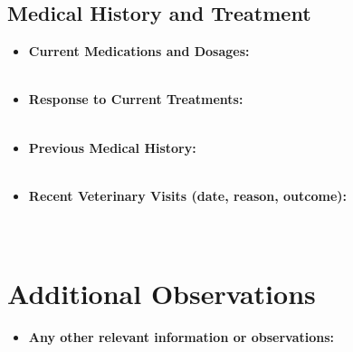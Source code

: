 \documentclass{article}
\begin{document}
\subsection*{Medical History and Treatment}
\begin{itemize}
    \item \textbf{Current Medications and Dosages:} \\
    \underline{\hspace{\textwidth}} \\
    \underline{\hspace{\textwidth}}
    \item \textbf{Response to Current Treatments:} \\
    \underline{\hspace{\textwidth}} \\
    \underline{\hspace{\textwidth}}
    \item \textbf{Previous Medical History:} \\
    \underline{\hspace{\textwidth}} \\
    \underline{\hspace{\textwidth}}
    \item \textbf{Recent Veterinary Visits (date, reason, outcome):} \\
    \underline{\hspace{\textwidth}} \\
    \underline{\hspace{\textwidth}} \\
    \underline{\hspace{\textwidth}}
\end{itemize}

\section*{Additional Observations}
\begin{itemize}
    \item \textbf{Any other relevant information or observations:} \\
    \underline{\hspace{\textwidth}} \\
    \underline{\hspace{\textwidth}} \\
    \underline{\hspace{\textwidth}}
\end{itemize}
\end{document}
